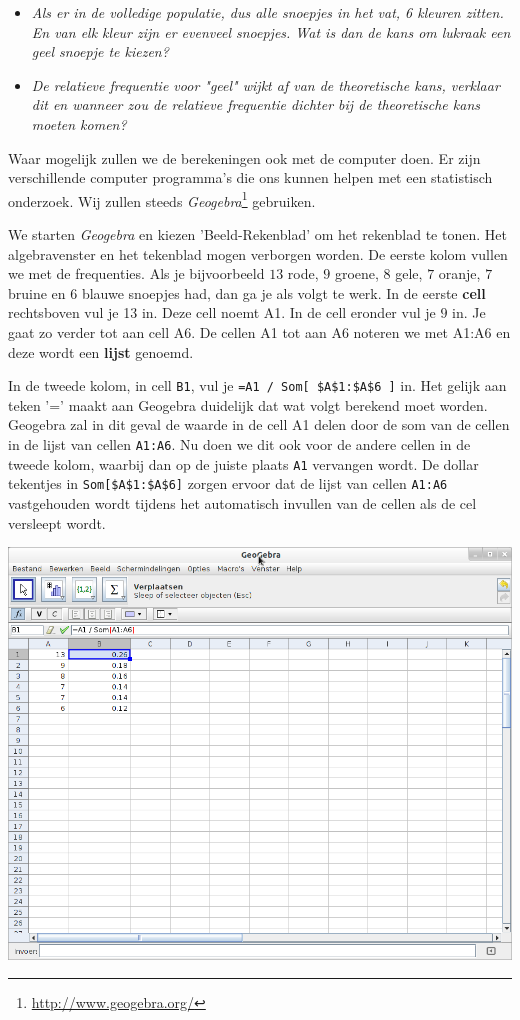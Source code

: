 \documentclass[11pt]{article}
\newcommand{\vraag}[2]{\begin{itemize}\item {\it #1} \vspace*{#2}\end{itemize}}
\begin{document}
\vraag{Als er in de volledige populatie, dus alle snoepjes in het vat, 6 kleuren zitten. En
van elk kleur zijn er evenveel snoepjes. Wat is dan de kans om lukraak een geel snoepje te kiezen?}{3cm}

\vraag{De relatieve frequentie voor "geel" wijkt af van de theoretische kans, verklaar dit en wanneer
zou de relatieve frequentie dichter bij de theoretische kans moeten komen?}{3cm}

Waar mogelijk zullen we de berekeningen ook met de computer doen. Er zijn verschillende computer programma's die ons kunnen helpen met een statistisch onderzoek. Wij zullen steeds {\it Geogebra}\footnote{\url{http://www.geogebra.org/}} gebruiken.

We starten {\it Geogebra} en kiezen 'Beeld-Rekenblad' om het rekenblad te tonen. Het algebravenster en het tekenblad mogen verborgen worden. De eerste kolom vullen we met de frequenties. Als je bijvoorbeeld $13$ rode, $9$ groene, $8$ gele, $7$ oranje, $7$ bruine en $6$ blauwe snoepjes had, dan ga je als volgt te werk. In de eerste {\bf cell} rechtsboven vul je 13 in. Deze cell noemt A1. In de cell eronder vul je $9$ in. Je gaat zo verder tot aan cell A6. De cellen A1 tot aan A6 noteren we met A1:A6 en deze wordt een {\bf lijst} genoemd.

In de tweede kolom, in cell \verb#B1#, vul je \verb#=A1 / Som[ $A$1:$A$6 ]# in. Het gelijk aan teken '=' maakt aan Geogebra duidelijk dat wat volgt berekend moet worden. Geogebra zal in dit geval de waarde in de cell A1 delen door de som van de cellen in de lijst van cellen \verb#A1:A6#. Nu doen we dit ook voor de andere cellen in de tweede kolom, waarbij dan op de juiste plaats \verb#A1# vervangen wordt. De dollar tekentjes in \verb#Som[$A$1:$A$6]# zorgen ervoor dat de lijst van cellen \verb#A1:A6# vastgehouden wordt tijdens het automatisch invullen van de cellen als de cel versleept wordt.

\begin{center}
  \includegraphics[width=14cm]{gg-relatieve_frequentie.png}
\end{center}
\end{document}
